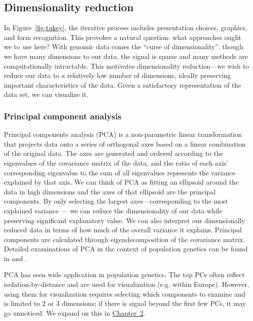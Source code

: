 \subsection{Dimensionality reduction}

In Figure~\ref{fig:tukey}, the iterative process includes presentation choices, graphics, and form recognition. This provokes a natural question: what approaches ought we to use here? With genomic data comes the ``curse of dimensionality'': though we have many dimensions to our data, the signal is sparse and many methods are computationally intractable. This motivates dimensionality reduction---we wish to reduce our data to a relatively low number of dimensions, ideally preserving important characteristics of the data. Given a satisfactory representation of the data set, we can visualize it.

\subsubsection{Principal component analysis}
Principal components analysis (PCA) is a non-parametric linear transformation that projects data onto a series of orthogonal axes based on a linear combination of the original data. The axes are generated and ordered according to the eigenvalues of the covariance matrix of the data, and the ratio of each axis' corresponding eigenvalue to the sum of all eigenvalues represents the variance explained by that axis. We can think of PCA as fitting an ellipsoid around the data in high dimensions and the axes of that ellipsoid are the principal components. By only selecting the largest axes---corresponding to the most explained variance --- we can reduce the dimensionality of our data while preserving significant explanatory value. We can also interpret our dimensionally reduced data in terms of how much of the overall variance it explains. Principal components are calculated through eigendecomposition of the covariance matrix. Detailed examinations of PCA in the context of population genetics can be found in \cite{peter_geometric_2022} and \citep{mcvean_genealogical_2009}.

PCA has seen wide application in population genetics. The top PCs often reflect isolation-by-distance and are used for visualization (e.g. within Europe\citep{novembre2008europe}). However, using them for visualization requires selecting which components to examine and is limited to $2$ or $3$ dimensions; if there is signal beyond the first few PCs, it may go unnoticed. We expand on this in \hyperref[chap:chapter2]{Chapter~2}.

